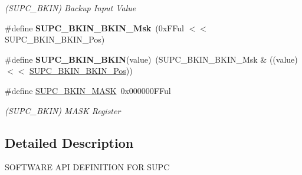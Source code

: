 \begin{DoxyCompactItemize}
\begin{DoxyCompactList}\small\item\em (S\+U\+P\+C\+\_\+\+B\+K\+I\+N) Backup Input Value \end{DoxyCompactList}\item 
\hypertarget{group___s_a_m_l21___s_u_p_c_ga1b6de61bd111f7cedd3e3810850aa1d2}{}\#define {\bfseries S\+U\+P\+C\+\_\+\+B\+K\+I\+N\+\_\+\+B\+K\+I\+N\+\_\+\+Msk}~(0x\+F\+Ful $<$$<$ S\+U\+P\+C\+\_\+\+B\+K\+I\+N\+\_\+\+B\+K\+I\+N\+\_\+\+Pos)\label{group___s_a_m_l21___s_u_p_c_ga1b6de61bd111f7cedd3e3810850aa1d2}

\item 
\hypertarget{group___s_a_m_l21___s_u_p_c_gabb85c1ceeacf4b50bed121bd77697450}{}\#define {\bfseries S\+U\+P\+C\+\_\+\+B\+K\+I\+N\+\_\+\+B\+K\+I\+N}(value)~(S\+U\+P\+C\+\_\+\+B\+K\+I\+N\+\_\+\+B\+K\+I\+N\+\_\+\+Msk \& ((value) $<$$<$ \hyperlink{group___s_a_m_l21___s_u_p_c_ga0c3e739bf612572843aeeed08421d891}{S\+U\+P\+C\+\_\+\+B\+K\+I\+N\+\_\+\+B\+K\+I\+N\+\_\+\+Pos}))\label{group___s_a_m_l21___s_u_p_c_gabb85c1ceeacf4b50bed121bd77697450}

\item 
\hypertarget{group___s_a_m_l21___s_u_p_c_ga2deecf9ddafe40fadb42754307362861}{}\#define \hyperlink{group___s_a_m_l21___s_u_p_c_ga2deecf9ddafe40fadb42754307362861}{S\+U\+P\+C\+\_\+\+B\+K\+I\+N\+\_\+\+M\+A\+S\+K}~0x000000\+F\+Ful\label{group___s_a_m_l21___s_u_p_c_ga2deecf9ddafe40fadb42754307362861}

\begin{DoxyCompactList}\small\item\em (S\+U\+P\+C\+\_\+\+B\+K\+I\+N) M\+A\+S\+K Register \end{DoxyCompactList}\end{DoxyCompactItemize}


\subsection{Detailed Description}
S\+O\+F\+T\+W\+A\+R\+E A\+P\+I D\+E\+F\+I\+N\+I\+T\+I\+O\+N F\+O\+R S\+U\+P\+C 